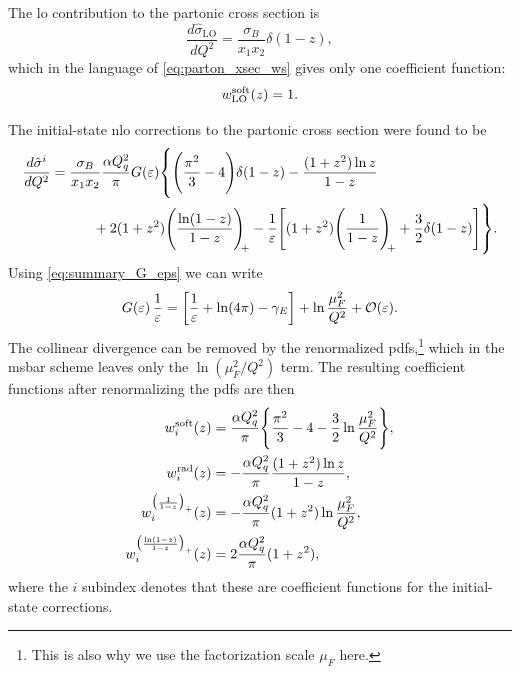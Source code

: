 The \gls{lo} contribution to the partonic cross section is
\begin{equation}
    \frac{d\hat\sigma_{\mathrm{LO}}}{dQ^2} = \frac{\sigma_B}{x_1 x_2}\delta(1-z),
\end{equation}
which in the language of \cref{eq:parton_xsec_ws} gives only one coefficient function:
\begin{equation}\label{eq:hadron_w_lo}
    w^{\text{soft}}_{\mathrm{LO}}(z) = 1.
\end{equation}

The initial-state \gls{nlo} corrections to the partonic cross section were found to be
\begin{equation}
    \begin{split}
        \frac{d\hat\sigma^i}{dQ^2} &= \frac{\sigma_B}{x_1 x_2} \frac{\alpha Q_q^2}{\pi} G(\eps)
        \vastl\{
            \Biggl(\frac{\pi^2}{3} - 4\Biggr)\delta(1-z)
            - \frac{(1+z^2)\ln z}{1-z}
            \\ &\hspace{3em}
            + 2(1+z^2) \plusdistln
            - \frac{1}{\eps}\Biggl[ (1+z^2)\plusdist + \frac{3}{2}\delta(1-z) \Biggr]
        \vastr\}.
    \end{split}
\end{equation}
Using \cref{eq:summary_G_eps} we can write
\begin{equation}
    G(\varepsilon) \, \frac{1}{\varepsilon} = \biggl[ \frac{1}{\varepsilon} + \ln(4\pi) - \gamma_E \biggr] + \ln\frac{\mu_F^2}{Q^2} + \mathcal{O}(\varepsilon).
\end{equation}
The collinear divergence can be removed by the renormalized \glspl{pdf},\footnote{This is also why we use the factorization scale $\mu_F$ here.} which in the \gls{msbar} scheme leaves only the $\ln(\mu_F^2/Q^2)$ term.
The resulting coefficient functions after renormalizing the \glspl{pdf} are then
\begin{subequations}
\label{eq:hadron_w_initial_state}
\begin{align}
    w^{\text{soft}}_i(z) &= \frac{\alpha Q_q^2}{\pi} \Biggl\{ \frac{\pi^2}{3} - 4 - \frac{3}{2} \ln\frac{\mu_F^2}{Q^2} \Biggr\},
    \\
    w^{\text{rad}}_i(z) &= -\frac{\alpha Q_q^2}{\pi} \frac{(1+z^2)\ln z}{1-z},
    \\
    w^{\bigl(\frac{1}{1-z}\bigr)_+}_i(z) &= -\frac{\alpha Q_q^2}{\pi} (1+z^2) \ln\frac{\mu_F^2}{Q^2},
    \\
    w^{\bigl(\frac{\ln(1-z)}{1-z}\bigr)_+}_i(z) &= 2 \frac{\alpha Q_q^2}{\pi} (1+z^2),
\end{align}
\end{subequations}
where the $i$ subindex denotes that these are coefficient functions for the initial-state corrections.

